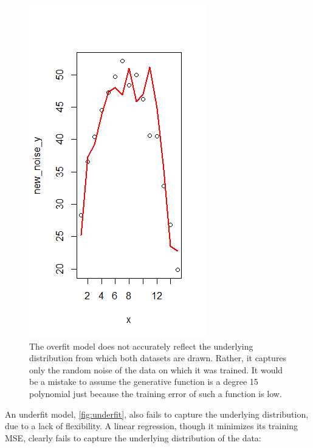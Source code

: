 \documentclass[12pt,twoside]{reedthesis}
\begin{document}
\begin{figure}
\centering
\includegraphics{figure/badfit.png}
\caption{\label{fig:overfitre}The overfit model does not accurately reflect
the underlying distribution from which both datasets are drawn. Rather,
it captures only the random noise of the data on which it was trained.
It would be a mistake to assume the generative function is a degree 15
polynomial just because the training error of such a function is low.}
\end{figure}
An underfit model, \ref{fig:underfit}, also fails to capture the
underlying distribution, due to a lack of flexibility. A linear
regression, though it minimizes its training MSE, clearly fails to
capture the underlying distribution of the data:
\end{document}
